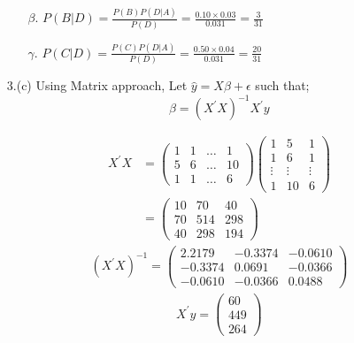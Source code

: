 \documentclass[12pt,a4paper, fleq]{article}
\begin{document}
\begin{itemize}
\begin{itemize}
$\beta.$ $P(B|D) = \frac{P(B)P(D|A)}{P(D)} = \frac{0.10\times 0.03}{0.031} = \frac{3}{31}$

$\gamma.$ $P(C|D) = \frac{P(C)P(D|A)}{P(D)} = \frac{0.50\times 0.04}{0.031} = \frac{20}{31}$
\end{itemize}

\item[3.(c)] %
Using Matrix approach, Let $\hat{y} = X\beta + \epsilon$ such that;
$$\beta = (X^\prime X)^{-1}X^\prime y$$

\begin{equation*}
\begin{split}
X^\prime X & =
\begin{pmatrix}
1 & 1 & \ldots & 1\\
5 & 6 & \ldots & 10\\
1 & 1 & \ldots & 6
\end{pmatrix}
\begin{pmatrix}
1 & 5 & 1\\
1 & 6 & 1\\
\vdots & \vdots & \vdots\\
1 & 10 & 6 
\end{pmatrix}\\
& = \begin{pmatrix}
10 & 70 & 40\\
70 & 514 & 298\\
40 & 298 & 194
\end{pmatrix}
\end{split}
\end{equation*}
\begin{equation*}
\begin{split}
(X^\prime X)^{-1} =
\begin{pmatrix}
2.2179 & -0.3374 & -0.0610\\
-0.3374 & 0.0691 & −0.0366\\
-0.0610 & −0.0366 & 0.0488
\end{pmatrix}
\end{split}
\end{equation*}
\begin{equation*}
\begin{split}
X^\prime y =
\begin{pmatrix}
60\\
449\\
264
\end{pmatrix}
\end{split}
\end{equation*}
\begin{equation*}

\end{equation*}
\end{itemize}
\end{document}
